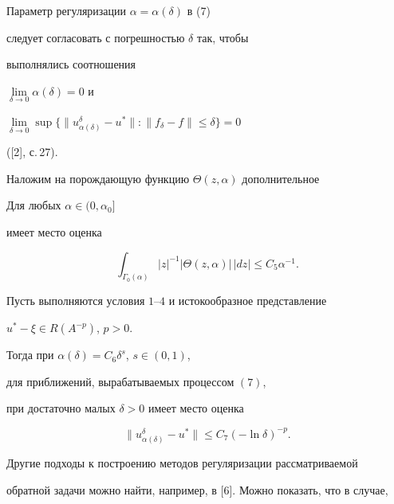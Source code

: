 Параметр регуляризации $\alpha=\alpha(\delta)$ в (7)


следует согласовать с погрешностью $\delta$ так, чтобы


выполнялись соотношения


$\lim\limits_{\delta\to 0} \alpha(\delta) = 0$ и


$\lim\limits_{\delta\to 0}


\sup\{ \| u_{\alpha(\delta)}^\delta-u^*\|:\|f_\delta-f\|\leq\delta\}=0$


([2], с.\,27).





Наложим на порождающую функцию $\Theta(z,\alpha)$ дополнительное





\begin{cond}


Для любых $\alpha\in(0,\alpha_0]$


имеет место оценка


$$


\int_{\Gamma_0(\alpha)} | z|^{-1}|\Theta(z,\alpha)|\,


| d z| \leq C_5{\alpha}^{-1}.


$$


\end{cond}





\begin{thm}


Пусть выполняются условия $1$--$4$ и истокообразное представление 


$u^* - \xi \in R(A^{-p})$, ${p>0}$.


Тогда при $\alpha(\delta)=C_6{\delta}^s$, $s\in(0, 1)$, 


для приближений, вырабатываемых процессом $(7)$,


при достаточно малых $\delta>0$ имеет место оценка


$$


\| u_{\alpha(\delta)}^{\delta} - u^* \| \leq C_7(-\ln\delta)^{-p}.


$$


\end{thm}





Другие подходы к построению методов регуляризации рассматриваемой 


обратной задачи можно найти, например, в [6]. Можно показать, что в случае, 


